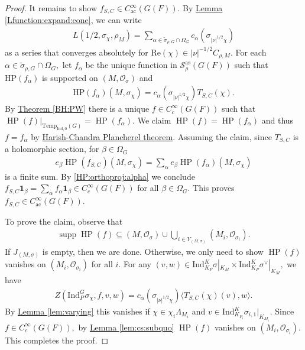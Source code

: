 \documentclass[10pt]{amsart}
\theoremstyle{definition}
\numberwithin{equation}{section}
\DeclareMathOperator{\supp}{\mathrm{supp}}
\numberwithin{equation}{subsection}
\newcommand{\Ind}{\mathrm{Ind}}
\newcommand{\Temp}{\mathrm{Temp}}
\newcommand{\HP}{\mathop{\mathrm{HP}}\nolimits}
\begin{document}
\begin{proof} It remains to show $f_{S,C}\in C^\infty_{\mathrm{ac}}(G(F)).$ By \hyperref[Lfunction:expand:cone]{Lemma \ref{Lfunction:expand:cone}},  we can write 
\begin{align*}
       L(1/2,\sigma_\chi,\rho_M) = \sum_{\alpha\in\widetilde{\sigma}_{\rho,G}\cap \Omega_G} c_\alpha(\sigma_{|\nu|^{1/2}\chi})
\end{align*}
as a series that converges absolutely for $\mathrm{Re}(\chi)\in |\nu|^{-1/2}C_{\rho,M}.$ For each $\alpha\in \widetilde{\sigma}_{\rho,G}\cap \Omega_G,$ let $f_\alpha$ be the unique function in $\mathcal{S}^{\mathrm{as}}_\rho(G(F))$ such that $\mathrm{HP}(f_\alpha)$ is supported on $(M,\mathcal{O}_\sigma)$ and
\begin{align*}
    \mathrm{HP}(f_\alpha)(M,\sigma_\chi)=c_\alpha(\sigma_{|\nu|^{1/2}\chi})T_{S,C}(\chi).
\end{align*}
By \hyperref[BH:PW]{Theorem \ref{BH:PW}} there is a unique $f\in C^\infty_c(G(F))$ such that $\HP(f)|_{\Temp_{\Ind,0}(G)}=\HP(f_{\alpha}).$ We claim $\HP(f)=\HP(f_\alpha)$ and thus $f=f_\alpha$ by \hyperref[HCPlan]{Harish-Chandra Plancherel theorem}. Assuming the claim, since $T_{S,C}$ is a holomorphic section, for $\beta\in \Omega_G$
\begin{align*}
    e_\beta\HP(f_{S,C})(M,\sigma_\chi) = \sum_\alpha e_\beta \HP(f_\alpha)(M,\sigma_\chi)
\end{align*}
is a finite sum. By \eqref{HP:orthoproj:alpha} we conclude $f_{S,C}\mathbf{1}_\beta = \sum_\alpha f_\alpha\mathbf{1}_\beta\in C_c^\infty(G(F))$ for all $\beta\in \Omega_G$. This proves $f_{S,C}\in C^\infty_{\mathrm{ac}}(G(F))$.

    To prove the claim, observe that 
    \begin{align*}
        \supp \HP(f)\subseteq (M,\mathcal{O}_\sigma)\cup \bigcup_{i\in Y_{(M,\sigma)}}  (M_i,\mathcal{O}_{\sigma_i}).
    \end{align*}
    If $J_{(M,\sigma)}$ is empty, then we are done. Otherwise, we only need to show $\HP(f)$ vanishes on $(M_i,\mathcal{O}_{\sigma_i})$ for all $i$. For any $(v,w)\in \Ind_{K_{P}}^K \sigma|_{K_M}\times \Ind_{K_{P}}^K \sigma^\lor|_{K_M},$ we have
    \begin{align*}
        Z(\mathrm{\Ind}_{P}^G \sigma_\chi,f,v,w)=c_{\alpha}(\sigma_{|\nu|^{1/2}\chi})\langle T_{S,C}(\chi)(v),w\rangle.
    \end{align*}
    By \hyperref[lem:varying]{Lemma \ref{lem:varying}} this vanishes if $\chi\in \chi_i\Lambda_{M_i}$ and $v\in \mathrm{Ind}_{K_{P_i}}^K \sigma_{i,1}|_{K_{M_i}}.$ Since $f\in C^\infty_c(G(F)),$  by  \hyperref[lem:cs:subquo]{Lemma \ref{lem:cs:subquo}} $\HP(f)$ vanishes on $(M_i,\mathcal{O}_{\sigma_i})$. This completes the proof.
\end{proof}
\end{document}
